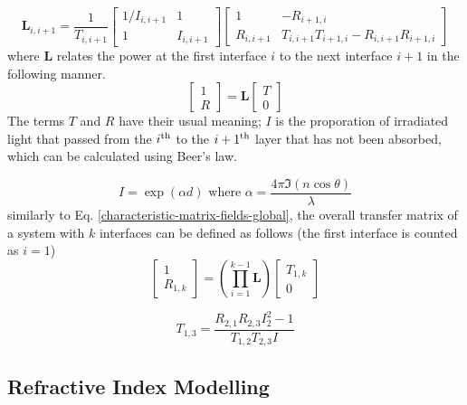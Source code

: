 \documentclass[10pt,a4paper,portrait]{report}
\begin{document}
\begin{equation}
\mathbf{L}_{i,i+1} = 
\frac{1}{T_{i,i+1}}
\begin{bmatrix}
1/I_{i,i+1} & 1\\
1           & I_{i,i+1}
\end{bmatrix}
\begin{bmatrix}
1         & -R_{i+1,i}\\
R_{i,i+1} & T_{i,i+1} T_{i+1,i} - R_{i,i+1} R_{i+1,i} 
\end{bmatrix}
\end{equation}
where $\mathbf{L}$ relates the power at the first interface $i$ to the next interface $i+1$ in the following manner.
\begin{equation}
\begin{bmatrix}
1 \\ R
\end{bmatrix}
=
\mathbf{L}
\begin{bmatrix}
T \\ 0
\end{bmatrix}
\end{equation}
The terms $T$ and $R$ have their usual meaning; $I$ is the proporation of irradiated light that passed from the $i^{\mathrm{th}}$ to the $i+1^{\mathrm{th}}$ layer that has not been absorbed, which can be calculated using Beer's law.


\begin{equation}
I = \exp\left(\alpha d\right)\mbox{  where  }\alpha = \frac{4\pi \Im \left( n \cos\theta \right)}{\lambda}
\end{equation}
similarly to Eq. \ref{characteristic-matrix-fields-global}, the overall transfer matrix of a system with $k$ interfaces can be defined as follows (the first interface is counted as $i=1$)
\begin{equation}
\label{eq:beers-law}
\begin{bmatrix}
1 \\ R_{1,k}
\end{bmatrix}
=
\left(\prod\limits_{i=1}^{k-1} \mathbf{L}\right)
\begin{bmatrix}
T_{1,k} \\ 0
\end{bmatrix}
\end{equation}

\begin{equation}
T_{1,3} = \frac{R_{2,1} R_{2,3} I_2^2-1}{T_{1,2}T_{2,3}I}
\end{equation}

\subsection{Refractive Index Modelling}
\end{document}
